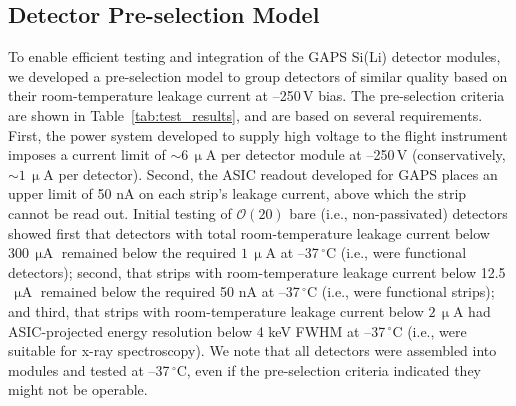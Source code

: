\documentclass[journal]{IEEEtran}
\begin{document}
\subsection{Detector Pre-selection Model}
To enable efficient testing and integration of the GAPS Si(Li) detector modules, we developed a pre-selection model to group detectors of similar quality based on their room-temperature leakage current at --250\,V bias. The pre-selection criteria are shown in Table~\ref{tab:test_results}, and are based on several requirements. First, the power system developed to supply high voltage to the flight instrument imposes a current limit of ${\sim}6\,\upmu\text{A}$ per detector module at --250\,V (conservatively, ${\sim}1\,\upmu\text{A}$ per detector). Second, the ASIC readout developed for GAPS places an upper limit of 50 nA on each strip's leakage current, above which the strip cannot be read out. Initial testing of $\mathcal{O}(20)$ bare (i.e., non-passivated) detectors showed first that detectors with total room-temperature leakage current below 300$\,\upmu\text{A}$ remained below the required $1\,\upmu\text{A}$ at --37$\,^\circ\text{C}$ (i.e., were functional detectors); second, that strips with room-temperature leakage current below 12.5$\,\upmu\text{A}$ remained below the required 50 nA at --37$\,^\circ\text{C}$ (i.e., were functional strips); and third, that strips with room-temperature leakage current below $2\,\upmu\text{A}$ had ASIC-projected energy resolution below 4 keV FWHM at --37$\,^\circ\text{C}$ (i.e., were suitable for x-ray spectroscopy). We note that all detectors were assembled into modules and tested at --37$\,^\circ\text{C}$, even if the pre-selection criteria indicated they might not be operable.
%


%
\end{document}
